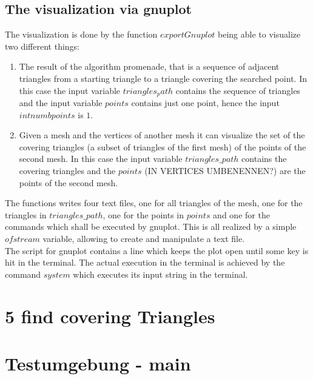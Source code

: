 \documentclass[10pt]{article}
\begin{document}
\subsection{The visualization via gnuplot}
	The visualization is done by the function $ exportGnuplot $ being able to visualize two different things: 
	\begin{enumerate}
		\item 
		The result of the algorithm promenade, that is a sequence of adjacent triangles from a starting triangle to a triangle covering the searched point. 
		In this case the input variable $ triangles_path $ contains the sequence of triangles and the input variable $  points $ contains just one point, hence the input $ int numbpoints $ is $ 1 $. 
		\item 
		Given a mesh and the vertices of another mesh it can visualize the set of the covering triangles (a subset of triangles of the first mesh) of the points of the second mesh. 
		In this case the input variable $ triangles\_path $ contains the covering triangles and the $ points $ (IN VERTICES UMBENENNEN?) are the points of the second mesh. 
	\end{enumerate}
The functions writes four text files, one for all triangles of the mesh, one for the triangles in $ triangles\_path $, one for the points in $ points $ and one for the commands which shall be executed by gnuplot. This is all realized by a simple $ ofstream $ variable, allowing to create and manipulate a text file. \\
The script for gnuplot contains a line which keeps the plot open until some key is hit in the terminal. 
The actual execution in the terminal is achieved by the command $ system $ which executes its input string in the terminal. 

\section{5 find covering Triangles}

\section{Testumgebung - main}
\end{document}
